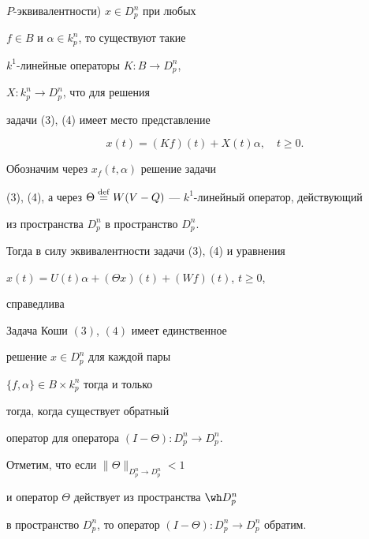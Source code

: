 $P$-эквивалентности) $x \in D_p^n$ при любых


$f \in B$ и $\alpha \in k_p^n$, то существуют такие


$k^1$-линейные операторы $K:B \to D_p^n$,


$X: k_p^n \to D_p^n$, что для решения


задачи (3), (4) имеет место представление


\begin{equation}


x(t) = (Kf)(t) + X(t)\alpha,\quad t \ge 0.


\end{equation}





Обозначим через $x_f(t,\alpha )$ решение задачи


(3), (4), а через $\Theta\Def


W(V - Q)$ --- $k^1$-линейный оператор, действующий


из пространства $D^n_p$ в пространство $D^n_p$.


Тогда в силу эквивалентности задачи (3), (4) и уравнения


$x(t)=U(t)\alpha+(\Theta x)(t)+(W f)(t)$, $t\ge 0$, 


справедлива





\begin{lem} Задача Коши $(3)$, $(4)$ имеет единственное


решение $x \in D^n_p$ для каждой пары


$\{f,\alpha \} \in B\times k_p^n$ тогда и только


тогда, когда существует обратный


оператор для оператора $(I - \Theta ): D_p^n\to D_p^n$.


\end{lem}





Отметим, что если $\|\Theta \|_{D_p^n\to D_p^n} < 1$


и оператор $\Theta $ действует из пространства $\wh D_p^n$


в пространство $D_p^n$, то оператор $(I - \Theta ): D_p^n


\to D_p^n$ обратим.






